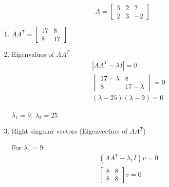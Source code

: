 \documentclass{blog}
\begin{document}
\begin{example}
    \begin{equation*}
        A = \begin{bmatrix}3 & 2 & 2 \\ 2 & 3 & -2\end{bmatrix}
    \end{equation*}

    \begin{enumerate}
        \item $AA^{T} = \begin{bmatrix}17 & 8 \\ 8 & 17\end{bmatrix}$
        \item Eigenvalues of $AA^{T}$
              \begin{gather*}
                  |AA^{T} - \lambda I| = 0 \\
                  \begin{vmatrix}17-\lambda & 8 \\ 8 & 17-\lambda\end{vmatrix} = 0 \\
                  (\lambda - 25)(\lambda - 9) = 0
              \end{gather*}

              $\lambda_{1} = 9$, $\lambda_{2} = 25$
        \item Right singular vectors (Eigenvectors of $AA^{T}$)

              For $\lambda_{1} = 9$:
              \begin{gather*}
                  (AA^{T} - \lambda_{1} I)v = 0 \\
                  \begin{bmatrix}8 & 8 \\ 8 & 8\end{bmatrix} v = 0
              \end{gather*}
    \end{enumerate}
\end{example}

\printbibliography
\end{document}
